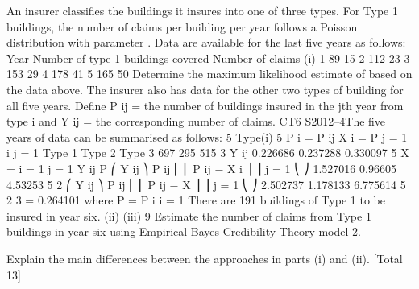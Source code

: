 An insurer classifies the buildings it insures into one of three types. For Type 1
buildings, the number of claims per building per year follows a Poisson distribution
with parameter \lambda . Data are available for the last five years as follows:
Year
Number of type 1 buildings covered
Number of claims
(i)
1
89
15
2
112
23
3
153
29
4
178
41
5
165
50
Determine the maximum likelihood estimate of \lambda  based on the data above. 
The insurer also has data for the other two types of building for all five years. Define
P ij = the number of buildings insured in the jth year from type i and
Y ij = the corresponding number of claims.
CT6 S2012–4The five years of data can be summarised as follows:
5
Type(i)
5
P i = \sum  P ij
X i = \sum 
P
j = 1 i
j = 1
Type 1
Type 2
Type 3
697
295
515
3
Y ij
0.226686
0.237288
0.330097
5
X = \sum \sum 
i = 1 j = 1
Y ij
P
⎛ Y ij
⎞
\sum  P ij ⎜ ⎜ P ij − X i ⎟ ⎟
j = 1 ⎝
⎠
1.527016
0.96605
4.53253
5
2
⎛ Y ij
⎞
\sum  P ij ⎜ ⎜ P ij − X ⎟ ⎟
j = 1 ⎝
⎠
2.502737
1.178133
6.775614
5
2
3
= 0.264101 where P = \sum  P i
i = 1
There are 191 buildings of Type 1 to be insured in year six.
(ii)
(iii)
9
Estimate the number of claims from Type 1 buildings in year six using
Empirical Bayes Credibility Theory model 2.

Explain the main differences between the approaches in parts (i) and (ii). 
[Total 13]


